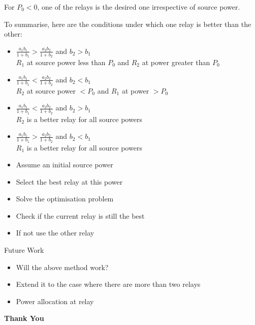 \documentclass{beamer}
\begin{document}
\begin{frame}
	For $P_0 < 0$, one of the relays is the desired one irrespective of source power.
\end{frame}
\begin{frame}
	To summarise, here are the conditions under which one relay is better than the other:
	\begin{itemize}
		\item $\frac{a_1b_1}{1+b_1} >	\frac{a_2b_2}{1+b_2}$ and $b_2 > b_1$ \\
			$R_1$ at source power less than  $P_0$ and $R_2$ at power greater than $P_0$
		\item $\frac{a_1b_1}{1+b_1} < \frac{a_2b_2}{1+b_2}$ and $b_2 < b_1$ \\
			$R_2$ at source power $<P_0$ and $R_1$ at power $>P_0$
		\item $\frac{a_1b_1}{1+b_1} < \frac{a_2b_2}{1+b_2}$ and $b_2 > b_1$ \\
			$R_2$ is a better relay for all source powers
		\item $\frac{a_1b_1}{1+b_1} >	\frac{a_2b_2}{1+b_2}$ and $b_2 < b_1$ \\
			$R_1$ is a better relay for all source powers
	\end{itemize}
\end{frame}

\begin{frame}{}
	\vspace{1cm}
	\begin{itemize}  
		\item
			Assume an initial source power
			\vspace{1cm}
		\item Select the best relay at this power
		\item Solve the optimisation problem
		\item Check if the current relay is still the best
		\item If not use the other relay
	\end{itemize}
\end{frame}


\begin{frame}{Future Work}
	\vspace{1cm}
	\begin{itemize}  
		\item
			Will the above method work?
			\vspace{1cm}
			\pause
		\item Extend it to the case where there are more than two relays
			\pause
		\item Power allocation at relay
	\end{itemize}
\end{frame}


\begin{frame}{}
	\centering
	\textbf{Thank You}
\end{frame}
\end{document}
